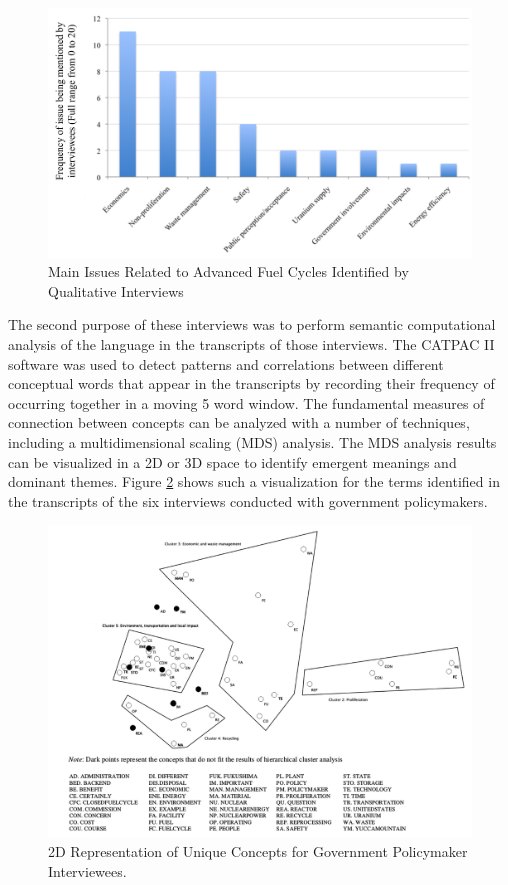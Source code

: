 \begin{figure}[htbp]
  \centering
  \includegraphics[width=0.7\columnwidth]{./images/interview_2}
  \caption{Main Issues Related to Advanced Fuel Cycles Identified by Qualitative Interviews}
  \label{fig:interview_2}
\end{figure}

The second purpose of these interviews was to perform semantic computational
analysis of the language in the transcripts of those interviews.  The CATPAC
II software was used to detect patterns and correlations between different
conceptual words that appear in the transcripts by recording their frequency
of occurring together in a moving 5 word window.  The fundamental measures of
connection between concepts can be analyzed with a number of techniques,
including a multidimensional scaling (MDS) analysis.  The MDS analysis results
can be visualized in a 2D or 3D space to identify emergent meanings and
dominant themes.  Figure \ref{fig:word_frequency_mds} shows such a
visualization for the terms identified in the transcripts of the six
interviews conducted with government policymakers.

\begin{figure}[htbp]
  \centering
  \includegraphics[width=0.7\columnwidth]{./images/word_frequency_mds}
  \caption{2D Representation of Unique Concepts for Government Policymaker Interviewees.}
  \label{fig:word_frequency_mds}
\end{figure}

